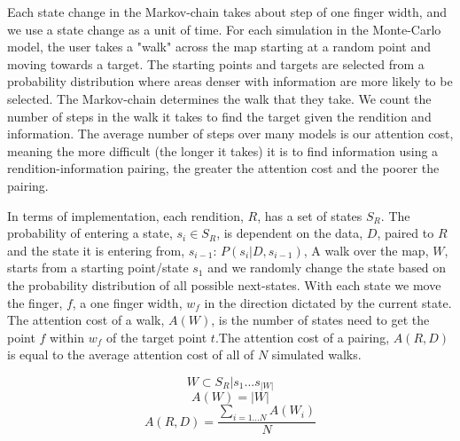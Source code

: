 Each state change in the Markov-chain takes about step of one finger width, and we use a state change as a unit of time. For each simulation in the Monte-Carlo model, the user takes a "walk" across the map starting at a random point and moving towards a target. The starting points and targets are selected from a probability distribution where areas denser with information are more likely to be selected. The Markov-chain determines the walk that they take. We count the number of steps in the walk it takes to find the target given the rendition and information. The average number of steps over many models is our attention cost, meaning the more difficult (the longer it takes) it is to find information using a rendition-information pairing, the greater the attention cost and the poorer the pairing. 

In terms of implementation, each rendition, $R$, has a set of states $S_R$. The probability of entering a state, $s_i\in S_R$, is dependent on the data, $D$, paired to $R$ and the state it is entering from, $s_{i-1}$: $P(s_i | D, s_{i-1})$, A walk over the map, $W$, starts from a starting point/state $s_1$ and we randomly change the state based on the probability distribution of all possible next-states. With each state we move the finger, $f$, a one finger width, $w_f$ in the direction dictated by the current state. The attention cost of a walk, $A(W)$, is the number of states need to get the point $f$ within $w_f$ of the target point $t$.The attention cost of a pairing, $A(R,D)$ is equal to the average attention cost of all of $N$ simulated walks.

\begin{equation}
W \subset S_R | s_1...s_{|W|}
\end{equation}
\begin{equation}
A(W) = |W|
\end{equation}
\begin{equation}
A(R,D) = \frac{\sum_{i=1...N} A(W_i)}{N}
\end{equation}